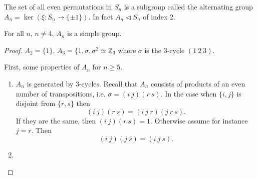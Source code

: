 \begin{defn}[]
The set of all even permutations in $S_n$ is a subgroup called the
alternating group $A_n = \ker (\xi : S_n \to \{ \pm 1 \})$. In fact
$A_n \triangleleft S_n$ of index 2.
\end{defn}

\begin{theorem}
For all $n$, $n \neq 4$, $A_n$ is a simple group.
\end{theorem}
\begin{proof}
$A_2 = \{1\}$, $A_3 = \{1, \sigma, \sigma^2 \simeq \mathbb{Z}_3$ where
$\sigma$ is the 3-cycle $(1~2~3)$.

First, some properties of $A_n$ for $n \geq 5$.
\begin{enumerate}
  \item{
    $A_n$ is generated by 3-cycles.
    Recall that $A_n$ consists of products of an even number of
    transpositions, i.e. $\sigma = (i~j)(r~s)$. In the case when
    $\{i,j\}$ is disjoint from $\{r,s\}$ then
    $$
    (i~j)(r~s) = (i~j~r)(j~r~s).
    $$
    If they are the same, then $(i~j)(r~s) = 1$.
    Otherwise assume for instance $j = r$. Then
    $$
    (i~j)(j~s) = (i~j~s).
    $$
  }
  \item{
  }
\end{enumerate}
\end{proof}


